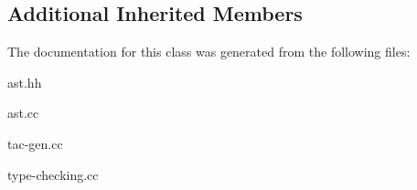 \subsection*{Additional Inherited Members}


The documentation for this class was generated from the following files\+:\begin{DoxyCompactItemize}
\item 
ast.\+hh\item 
ast.\+cc\item 
tac-\/gen.\+cc\item 
type-\/checking.\+cc\end{DoxyCompactItemize}
